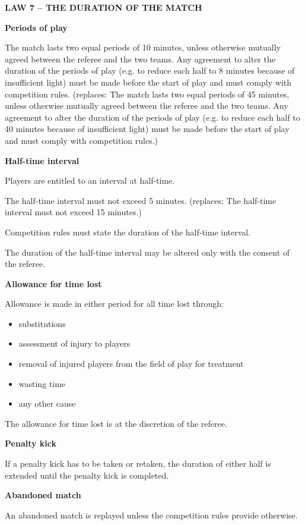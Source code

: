 \clearpage
\sffamily
{\bfseries\color[rgb]{0.4,0.4,0.4}
LAW 7 -- THE DURATION OF THE MATCH}

\bigskip

{\bfseries Periods of play }

\headlinebox

The match lasts two equal periods of 10 minutes, unless otherwise mutually agreed between the referee and the two teams. Any agreement to alter the duration of the periods of play (e.g. to reduce each half to 8 minutes because of insufficient light) must be made before the start of play and must comply with competition rules.
\textcolor[rgb]{0.4,0.4,0.4}{(replaces: The match lasts two equal periods of 45 minutes, unless otherwise mutually agreed between the referee and the two teams. Any agreement to alter the duration of the periods of play (e.g. to reduce each half to 40 minutes because of
insufficient light) must be made before the start of play and must comply with competition rules.)}

\bigskip

{\bfseries Half-time interval}

\headlinebox

Players are entitled to an interval at half-time.

The half-time interval must not exceed 5 minutes.
\textcolor[rgb]{0.4,0.4,0.4}{(replaces: The half-time interval must not exceed 15 minutes.) }

Competition rules must state the duration of the half-time interval.

The duration of the half-time interval may be altered only with the consent of the referee. 

\bigskip

{\bfseries Allowance for time lost}

\headlinebox

Allowance is made in either period for all time lost through: 

\begin{itemize}
\item substitutions
\item assessment of injury to players
\item removal of injured players from the field of play for treatment 
\item wasting time
\item any other cause
\end{itemize}

The allowance for time lost is at the discretion of the referee.

\bigskip

{\bfseries Penalty kick}

\headlinebox

If a penalty kick has to be taken or retaken, the duration of either half is extended until the penalty kick is completed.

\bigskip

{\sffamily
\textbf{Abandoned match} }

\headlinebox

An abandoned match is replayed unless the competition rules provide otherwise.
